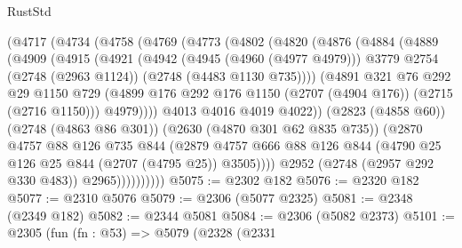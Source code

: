 \begin{lexlean}{RustStd}
\begin{coremodule}
            (@4717
              (@4734
                (@4758
                  (@4769
                    (@4773
                      (@4802
                        (@4820
                          (@4876
                            (@4884
                              (@4889
                                (@4909
                                  (@4915
                                    (@4921
                                      (@4942
                                        (@4945 (@4960 (@4977 @4979)))
                                        @3779
                                        @2754
                                        (@2748 (@2963 @1124))
                                        (@2748 (@4483 @1130 @735))))
                                    (@4891
                                      @321
                                      @76
                                      @292
                                      @29
                                      @1150
                                      @729
                                      (@4899
                                        @176
                                        @292
                                        @176
                                        @1150
                                        (@2707 (@4904 @176))
                                        (@2715 (@2716 @1150)))
                                      @4979))))
                              @4013
                              @4016
                              @4019
                              @4022))
                          (@2823 (@4858 @60))
                          (@2748 (@4863 @86 @301))
                          (@2630 (@4870 @301 @62 @835 @735))
                          (@2870
                            @4757
                            @88
                            @126
                            @735
                            @844
                            (@2879
                              @4757
                              @666
                              @88
                              @126
                              @844
                              (@4790 @25 @126 @25 @844 (@2707 (@4795 @25)) @3505))))
                        @2952
                        (@2748 (@2957 @292 @330 @483))
                        @2965))))))))))
@5075 := @2302 @182
@5076 := @2320 @182
@5077 := @2310 @5076
@5079 := @2306 (@5077 @2325)
@5081 := @2348 (@2349 @182)
@5082 := @2344 @5081
@5084 := @2306 (@5082 @2373)
@5101 := @2305
    (fun (fn : @53) =>
    @5079
      (@2328
        (@2331

\end{coremodule}
\end{lexlean}
